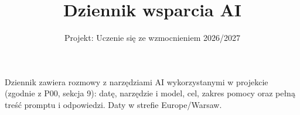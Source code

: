 \documentclass[11pt,a4paper]{article}
\title{Dziennik wsparcia AI}
\author{Projekt: Uczenie się ze wzmocnieniem 2026/2027}
\date{}
\begin{document}
\maketitle
Dziennik zawiera rozmowy z narzędziami AI wykorzystanymi w projekcie
(zgodnie z P00, sekcja 9): datę, narzędzie i model, cel, zakres pomocy
oraz pełną treść promptu i odpowiedzi. Daty w strefie Europe/Warsaw.

\tableofcontents
\clearpage

\end{document}
